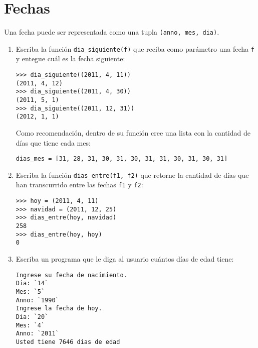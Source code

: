 \section{Fechas}

Una fecha puede ser representada como una tupla
\lstinline!(anno, mes, dia)!.

\begin{enumerate}

  \item
    Escriba la función \lstinline!dia_siguiente(f)! que reciba como
    parámetro una fecha \lstinline!f! y entegue cuál es la fecha
    siguiente:
\begin{lstlisting}
>>> dia_siguiente((2011, 4, 11))
(2011, 4, 12)
>>> dia_siguiente((2011, 4, 30))
(2011, 5, 1)
>>> dia_siguiente((2011, 12, 31))
(2012, 1, 1)
\end{lstlisting}

    Como recomendación, dentro de su función cree una lista con la cantidad
    de días que tiene cada mes:
\begin{lstlisting}
dias_mes = [31, 28, 31, 30, 31, 30, 31, 31, 30, 31, 30, 31]
\end{lstlisting}

  \item
    Escriba la función \lstinline!dias_entre(f1, f2)! que retorne la
    cantidad de días que han transcurrido entre las fechas \lstinline!f1!
    y \lstinline!f2!:
\begin{lstlisting}
>>> hoy = (2011, 4, 11)
>>> navidad = (2011, 12, 25)
>>> dias_entre(hoy, navidad)
258
>>> dias_entre(hoy, hoy)
0
\end{lstlisting}

  \item
    Escriba un programa que le diga al usuario cuántos días de edad tiene:
\begin{lstlisting}[language=testcase]
Ingrese su fecha de nacimiento.
Dia: `14`
Mes: `5`
Anno: `1990`
Ingrese la fecha de hoy.
Dia: `20`
Mes: `4`
Anno: `2011`
Usted tiene 7646 dias de edad
\end{lstlisting}

\end{enumerate}
